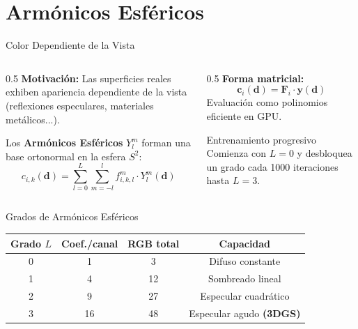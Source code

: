 \section{Armónicos Esféricos}

\begin{frame}{Color Dependiente de la Vista}
  \begin{columns}
    \begin{column}{0.5\textwidth}
      \textbf{Motivación:} Las superficies reales exhiben apariencia dependiente de la vista (reflexiones especulares, materiales metálicos...).

      \vspace{0.5em}
      Los \textbf{Armónicos Esféricos} $Y_l^m$ forman una base ortonormal en la esfera $S^2$:
      \[
        c_{i,k}(\mathbf{d}) = \sum_{l=0}^{L}\sum_{m=-l}^{l} f_{i,k,l}^m \cdot Y_l^m(\mathbf{d})
      \]
    \end{column}
    \begin{column}{0.5\textwidth}
      \textbf{Forma matricial:}
      \[
        \mathbf{c}_i(\mathbf{d}) = \mathbf{F}_i \cdot \mathbf{y}(\mathbf{d})
      \]
      Evaluación como polinomios eficiente en GPU.

      \vspace{0.5em}
      \begin{alertblock}{Entrenamiento progresivo}
        Comienza con $L=0$ y desbloquea un grado cada 1000 iteraciones hasta $L=3$.
      \end{alertblock}
    \end{column}
  \end{columns}
\end{frame}

\begin{frame}{Grados de Armónicos Esféricos}
  \centering
  \begin{tabular}{cccc}
    \toprule
    \textbf{Grado $L$} & \textbf{Coef./canal} & \textbf{RGB total} & \textbf{Capacidad} \\
    \midrule
    0 & 1  & 3  & Difuso constante \\
    1 & 4  & 12 & Sombreado lineal \\
    2 & 9  & 27 & Especular cuadrático \\
    3 & 16 & 48 & Especular agudo \textbf{(3DGS)} \\
    \bottomrule
  \end{tabular}

  \vspace{1em}
\end{frame}

